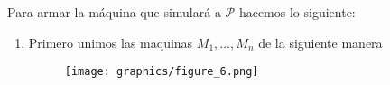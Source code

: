 \begin{frame}
  \PN Para armar la máquina que simulará a $\mathcal{P}$ hacemos lo siguiente:
  \begin{enumerate}[1)]
    \item Primero unimos las maquinas $M_{1}, \dotsc, M_{n}$ de la siguiente manera
      \begin{figure}[h]
        \centering
        \texttt{[image: graphics/figure\_6.png]}
      \end{figure}
  \end{enumerate}
\end{frame}
